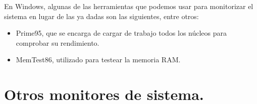 \begin{itemize}
	
	En Windows\cite{WMonitor}, algunas de las herramientas que podemos usar para monitorizar el sistema en lugar de las ya dadas son las siguientes, entre otros:\\
	\begin{itemize}
		\item Prime95\cite{prime95}, que se encarga de cargar de trabajo todos los núcleos para comprobar su rendimiento.
		\item MemTest86\cite{memtest86}, utilizado para testear la memoria RAM.
	\end{itemize}
\end{itemize}

\section{Otros monitores de sistema.}
